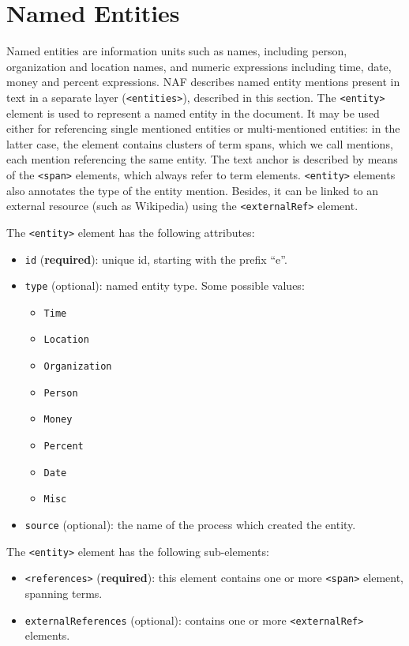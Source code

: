 
\section{Named Entities}
\label{sec:named-entities}

Named entities are information units such as names, including person,
organization and location names, and numeric expressions including time,
date, money and percent expressions. NAF describes named entity mentions
present in text in a separate layer (\texttt{<entities>}), described in this
section. The \texttt{<entity>} element is used to represent a named entity
in the document. It may be used either for referencing single mentioned
entities or multi-mentioned entities: in the latter case, the element
contains clusters of term spans, which we call mentions, each mention
referencing the same entity. The text anchor is described by means of the
\texttt{<span>} elements, which always refer to term
elements. \texttt{<entity>} elements also annotates the type of the entity
mention. Besides, it can be linked to an external resource (such as
Wikipedia) using the \texttt{<externalRef>} element.

The \texttt{<entity>} element has the following attributes:
\begin{itemize}
\item \texttt{id} (\textbf{required}): unique id, starting with the prefix ``e''.
\item \texttt{type} (optional): named entity type. Some possible values:
  \begin{itemize}
  \item \texttt{Time}
  \item \texttt{Location}
  \item \texttt{Organization}
  \item \texttt{Person}
  \item \texttt{Money}
  \item \texttt{Percent}
  \item \texttt{Date}
  \item \texttt{Misc}
\end{itemize}
\item \texttt{source} (optional): the name of the process which created the
  entity.
\end{itemize}

The \texttt{<entity>} element has the following sub-elements:
\begin{itemize}
\item \texttt{<references>} (\textbf{required}): this element contains one
  or more \texttt{<span>} element, spanning terms.
\item \texttt{externalReferences} (optional): contains one or more
  \texttt{<externalRef>} elements.
\end{itemize}


